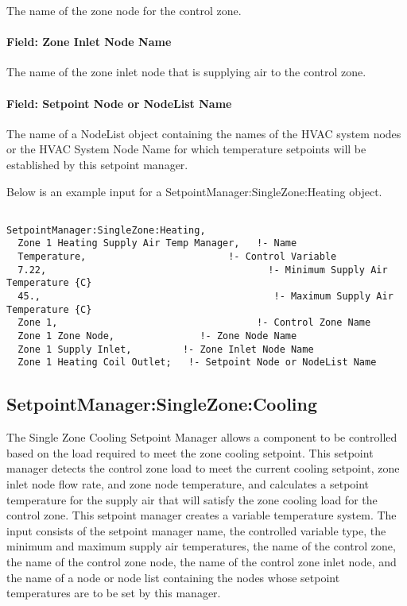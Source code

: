The name of the zone node for the control zone.

\paragraph{Field: Zone Inlet Node Name}\label{field-zone-inlet-node-name-1}

The name of the zone inlet node that is supplying air to the control zone.

\paragraph{Field: Setpoint Node or NodeList Name}\label{field-setpoint-node-or-nodelist-name-4}

The name of a NodeList object containing the names of the HVAC system nodes or the HVAC System Node Name for which temperature setpoints will be established by this setpoint manager.

Below is an example input for a SetpointManager:SingleZone:Heating object.

\begin{lstlisting}

SetpointManager:SingleZone:Heating,
  Zone 1 Heating Supply Air Temp Manager,   !- Name
  Temperature,                         !- Control Variable
  7.22,                                       !- Minimum Supply Air Temperature {C}
  45.,                                         !- Maximum Supply Air Temperature {C}
  Zone 1,                                   !- Control Zone Name
  Zone 1 Zone Node,               !- Zone Node Name
  Zone 1 Supply Inlet,         !- Zone Inlet Node Name
  Zone 1 Heating Coil Outlet;   !- Setpoint Node or NodeList Name
\end{lstlisting}

\subsection{SetpointManager:SingleZone:Cooling}\label{setpointmanagersinglezonecooling}

The Single Zone Cooling Setpoint Manager allows a component to be controlled based on the load required to meet the zone cooling setpoint. This setpoint manager detects the control zone load to meet the current cooling setpoint, zone inlet node flow rate, and zone node temperature, and calculates a setpoint temperature for the supply air that will satisfy the zone cooling load for the control zone. This setpoint manager creates a variable temperature system. The input consists of the setpoint manager name, the controlled variable type, the minimum and maximum supply air temperatures, the name of the control zone, the name of the control zone node, the name of the control zone inlet node, and the name of a node or node list containing the nodes whose setpoint temperatures are to be set by this manager.

